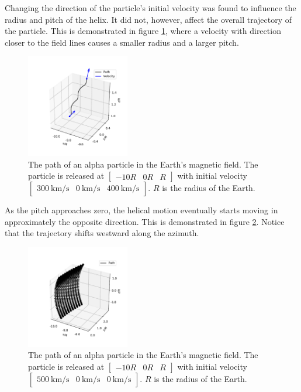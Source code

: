 \documentclass[5p,sort&compress]{elsarticle}
\begin{document}
Changing the direction of the particle's initial velocity was found to influence the radius and pitch of the helix. It did not, however, affect the overall trajectory of the particle. This is demonstrated in figure \ref{fig:helical2}, where a velocity with direction closer to the field lines causes a smaller radius and a larger pitch.

\begin{figure}[h]
    \centering
    \includegraphics[width=0.4\textwidth]{figure0.pdf}
    \caption{The path of an alpha particle in the Earth's magnetic field. The particle is released at $\begin{bmatrix} -10R&0R&R \end{bmatrix}$ with initial velocity $\begin{bmatrix} \SI{300}{\kilo \meter /\second}&\SI{0}{\kilo \meter /\second}&\SI{400}{\kilo \meter /\second} \end{bmatrix}$. $R$ is the radius of the Earth.}
    \label{fig:helical2}
\end{figure}

As the pitch approaches zero, the helical motion eventually starts moving in approximately the opposite direction. This is demonstrated in figure \ref{fig:helical3}. Notice that the trajectory shifts westward along the azimuth.

\begin{figure}[h]
    \centering
    \includegraphics[width=0.4\textwidth]{figure2.pdf}
    \caption{The path of an alpha particle in the Earth's magnetic field. The particle is released at $\begin{bmatrix} -10R&0R&R \end{bmatrix}$ with initial velocity $\begin{bmatrix} \SI{500}{\kilo \meter /\second}&\SI{0}{\kilo \meter /\second}&\SI{0}{\kilo \meter /\second} \end{bmatrix}$. $R$ is the radius of the Earth.}
    \label{fig:helical3}
\end{figure}
\end{document}
